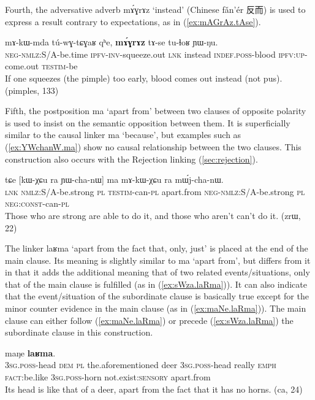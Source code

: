 \documentclass[oldfontcommands,oneside,a4paper,11pt]{article}
\newcommand{\ipa}[1]{{\phon \mbox{#1}}} %
\newcommand{\zh}[1]{{\cn #1}}
\newcommand{\refb}[1]{(\ref{#1})}
\begin{document}
Fourth, the adversative adverb \ipa{mɤ́ɣrɤz} `instead' (Chinese \ipa{fǎn'ér} \zh{反而}) is used to express a result contrary to expectations, as in  \refb{ex:mAGrAz.tAse}.  

\begin{exe}
\ex \label{ex:mAGrAz.tAse}
\gll
 \ipa{mɤ-kɯ-mda}    	\ipa{tú-wɣ-tɕɣaʁ}    	\ipa{qʰe,}    	\ipa{\textbf{mɤ́ɣrɤz}}    	\ipa{tɤ-se}    	\ipa{tu-ɬoʁ}    	\ipa{ɲɯ-ŋu.}    \\
 \textsc{neg-nmlz:S/A}-be.time \textsc{ipfv-inv}-squeeze.out \textsc{lnk} instead \textsc{indef.poss}-blood \textsc{ipfv:up}-come.out \textsc{testim}-be  \\
\glt If one squeezes (the pimple) too early, blood comes out instead (not pus). (pimples, 133)
 \end{exe}
 

Fifth, the  postposition \ipa{ma} `apart from' between two clauses of opposite polarity is used to insist on the semantic opposition between them.  It is superficially similar to the causal linker \ipa{ma} `because', but   examples such as \refb{ex:YWchanW.ma} show no causal relationship between the two clauses. This construction  also occurs with the Rejection linking \refb{sec:rejection}.
\begin{exe}
\ex \label{ex:YWchanW.ma}
\gll
\ipa{tɕe}  	[\ipa{kɯ-χɕu}  	\ipa{ra}  	\ipa{ɲɯ-cha-nɯ}] 	\ipa{ma}  	\ipa{mɤ-kɯ-χɕu}  	\ipa{ra}  	\ipa{mɯ́j-cha-nɯ.}  \\
\textsc{lnk} \textsc{nmlz}:S/A-be.strong \textsc{pl} \textsc{testim}-can-\textsc{pl} apart.from \textsc{neg-nmlz}:S/A-be.strong \textsc{pl} \textsc{neg:const}-can-\textsc{pl} \\
\glt Those who are strong are able to do it, and those who aren't can't do it. (zrɯ, 22)
\end{exe}

The   linker  \ipa{laʁma} `apart from the fact that, only, just' is placed at the end of the main clause. Its meaning is slightly similar to \ipa{ma} `apart from', but differs from it in that it adds the additional meaning that of two related events/situations, only that of the main clause is fulfilled (as in \refb{ex:sWza.laRma}). It can also indicate that the event/situation of the subordinate clause is basically true except for the minor counter evidence in the main clause  (as in \refb{ex:maNe.laRma}).   The main clause can either follow \refb{ex:maNe.laRma} or precede \refb{ex:sWza.laRma} the subordinate clause in this construction.
  \begin{exe}
\ex \label{ex:maNe.laRma}
\gll
[\ipa{ɯ-ku}  	\ipa{nɯ} \ipa{ra}   	\ipa{iɕqha}  	\ipa{qartsʰaz}  	\ipa{ɯ-ku}  	\ipa{wuma}  	\ipa{ʑo}  	\ipa{fse,}]  	\ipa{ɯ-ʁrɯ}  	\ipa{maŋe}  	\ipa{\textbf{laʁma}.}  	\\
\textsc{3sg.poss}-head \textsc{dem} \textsc{pl} the.aforementioned deer \textsc{3sg.poss}-head  really \textsc{emph} \textsc{fact}:be.like \textsc{3sg.poss}-horn not.exist:\textsc{sensory} apart.from \\
\glt Its head is like that of a deer, apart from the fact that it has no  horns. (ca, 24)
\end{exe} 
\end{document}
